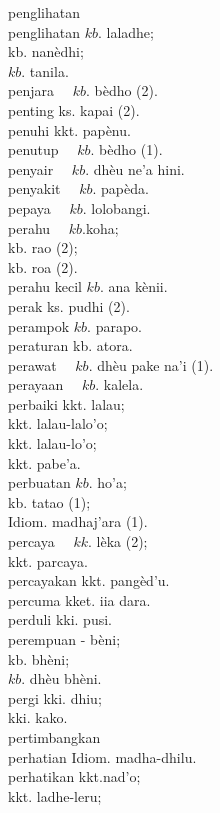 \documentclass[10pt]{article}
\begin{document}
penglihatan\\
penglihatan \(k b\). laladhe;\\
kb. nanèdhi;\\
\(k b\). tanila.\\
penjara \(\quad k b\). bèdho (2).\\
penting ks. kapai (2).\\
penuhi kkt. papènu.\\
penutup \(\quad k b\). bèdho (1).\\
penyair \(\quad k b\). dhèu ne'a hini.\\
penyakit \(\quad k b\). papèda.\\
pepaya \(\quad k b\). lolobangi.\\
perahu \(\quad k b\).koha;\\
kb. rao (2);\\
kb. roa (2).\\
perahu kecil \(k b\). ana kènii.\\
perak ks. pudhi (2).\\
perampok \(k b\). parapo.\\
peraturan kb. atora.\\
perawat \(\quad k b\). dhèu pake na'i (1).\\
perayaan \(\quad k b\). kalela.\\
perbaiki kkt. lalau;\\
kkt. lalau-lalo'o;\\
kkt. lalau-lo'o;\\
kkt. pabe'a.\\
perbuatan \(k b\). ho'a;\\
kb. tatao (1);\\
Idiom. madhaj'ara (1).\\
percaya \(\quad k k\). lèka (2);\\
kkt. parcaya.\\
percayakan kkt. pangèd'u.\\
percuma kket. iia dara.\\
perduli kki. pusi.\\
perempuan - bèni;\\
kb. bhèni;\\
\(k b\). dhèu bhèni.\\
pergi kki. dhiu;\\
kki. kako.\\
pertimbangkan\\
perhatian Idiom. madha-dhilu.\\
perhatikan kkt.nad'o;\\
kkt. ladhe-leru;\\
\end{document}
